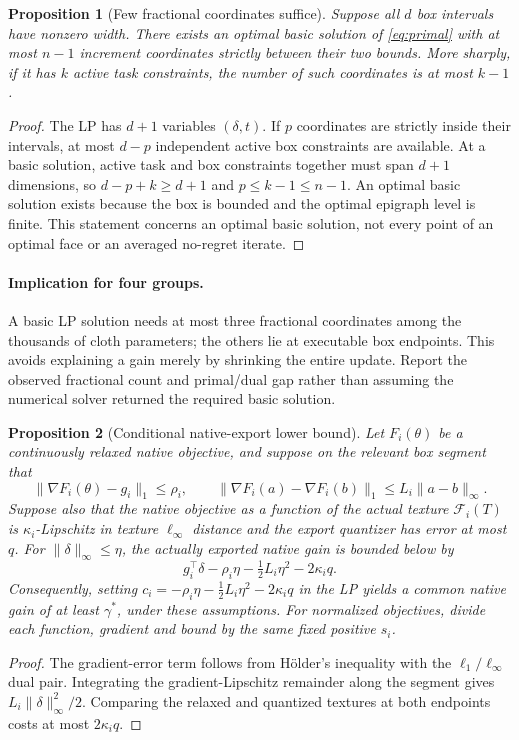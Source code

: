\documentclass[10pt]{article}
\newtheorem{proposition}{Proposition}
\begin{document}
\begin{proposition}[Few fractional coordinates suffice]
Suppose all $d$ box intervals have nonzero width. There exists an optimal basic
solution of \eqref{eq:primal} with at most $n-1$ increment coordinates strictly
between their two bounds. More sharply, if it has $k$ active task constraints,
the number of such coordinates is at most $k-1$.
\end{proposition}
\begin{proof}
The LP has $d+1$ variables $(\delta,t)$. If $p$ coordinates are strictly inside
their intervals, at most $d-p$ independent active box constraints are available.
At a basic solution, active task and box constraints together must span
$d+1$ dimensions, so $d-p+k\geq d+1$ and $p\leq k-1\leq n-1$.
An optimal basic solution exists because the box is bounded and the optimal
epigraph level is finite. This statement concerns an optimal basic solution,
not every point of an optimal face or an averaged no-regret iterate.
\end{proof}

\paragraph{Implication for four groups.}
A basic LP solution needs at most three fractional coordinates among the
thousands of cloth parameters; the others lie at executable box endpoints.
This avoids explaining a gain merely by shrinking the entire update. Report
the observed fractional count and primal/dual gap rather than assuming the
numerical solver returned the required basic solution.

\begin{proposition}[Conditional native-export lower bound]
Let $F_i(\theta)$ be a continuously relaxed native objective, and suppose on the
relevant box segment that
\[
 \|\nabla F_i(\theta)-g_i\|_1\leq\rho_i,\qquad
 \|\nabla F_i(a)-\nabla F_i(b)\|_1\leq L_i\|a-b\|_\infty.
\]
Suppose also that the native objective as a function of the actual texture
$\mathcal F_i(T)$ is $\kappa_i$-Lipschitz in texture $\ell_\infty$ distance and
the export quantizer has error at most $q$. For $\|\delta\|_\infty\leq\eta$,
the actually exported native gain is bounded below by
\[
 g_i^\top\delta-\rho_i\eta-\tfrac12 L_i\eta^2-2\kappa_iq.
\]
Consequently, setting $c_i=-\rho_i\eta-\tfrac12L_i\eta^2-2\kappa_iq$ in the
LP yields a common native gain of at least $\gamma^*$, under these assumptions.
For normalized objectives, divide each function, gradient and bound by the
same fixed positive $s_i$.
\end{proposition}
\begin{proof}
The gradient-error term follows from H\"older's inequality with the
$\ell_1/\ell_\infty$ dual pair. Integrating the gradient-Lipschitz remainder
along the segment gives $L_i\|\delta\|_\infty^2/2$. Comparing the relaxed and
quantized textures at both endpoints costs at most $2\kappa_iq$.
\end{proof}
\end{document}

